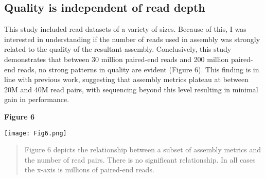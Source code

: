 \documentclass[10pt,letterpaper]{article}
\providecommand{\DIFdelbegin}{} %
\newcommand{\DIFscaledelfig}{0.5}
\newlength{\DIFdelgraphicswidth} %
\newlength{\DIFdelgraphicsheight} %
\newcommand{\DIFdelincludegraphics}[2][]{%
\sbox{\DIFdelgraphicsbox}{\DIFOincludegraphics[#1]{#2}}%
\settoboxwidth{\DIFdelgraphicswidth}{\DIFdelgraphicsbox} %
\settoboxtotalheight{\DIFdelgraphicsheight}{\DIFdelgraphicsbox} %
\scalebox{\DIFscaledelfig}{%
\parbox[b]{\DIFdelgraphicswidth}{\usebox{\DIFdelgraphicsbox}\\[-\baselineskip] \rule{\DIFdelgraphicswidth}{0em}}\llap{\resizebox{\DIFdelgraphicswidth}{\DIFdelgraphicsheight}{%
\setlength{\unitlength}{\DIFdelgraphicswidth}%
\begin{picture}(1,1)%
\thicklines\linethickness{2pt} %
{\color[rgb]{1,0,0}\put(0,0){\framebox(1,1){}}}%
{\color[rgb]{1,0,0}\put(0,0){\line( 1,1){1}}}%
{\color[rgb]{1,0,0}\put(0,1){\line(1,-1){1}}}%
\end{picture}%
}\hspace*{3pt}}} %
} %
\DeclareRobustCommand{\DIFdelbegin}{\DIFOdelbegin \let\includegraphics\DIFdelincludegraphics} %
\begin{document}
\subsection{Quality is independent of read depth}

This study included read datasets of a variety of sizes. Because of this, I was interested in understanding if the number of reads used in assembly was strongly related to the quality of the resultant assembly. Conclusively, this study demonstrates that between 30 million paired-end reads and 200 million paired-end reads, no strong patterns in quality are evident (Figure 6). This finding is in line with previous work, \citep{MacManes:2015iz} suggesting that assembly metrics plateau at between 20M and 40M read pairs, with sequencing beyond this level resulting in minimal gain in performance.  


\textbf{\hypertarget{Figure 6}{Figure 6}} \\
\centerline{\texttt{[image: Fig6.png]}}
\begin{quote}
\small{Figure 6 depicts the relationship between a subset of assembly metrics and the number of read pairs. There is no significant relationship. In all cases the x-axis is millions of paired-end reads. }
\end{quote}


    

\DIFdelbegin %

\end{document}
